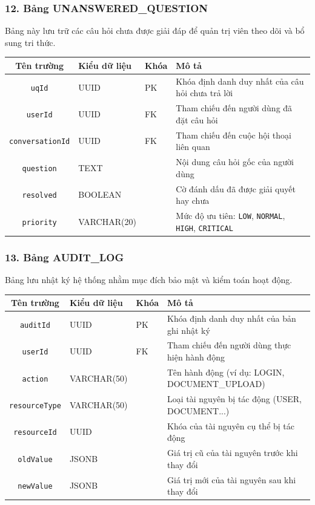 \documentclass[12pt,a4paper]{report}
\begin{document}
\subsubsection{12. Bảng UNANSWERED\_QUESTION}
Bảng này lưu trữ các câu hỏi chưa được giải đáp để quản trị viên theo dõi và bổ sung tri thức.

\begin{table}[H]
\centering
\begin{tabularx}{\textwidth}{|c|l|l|X|}
\hline
\rowcolor{gray!10}
Tên trường & Kiểu dữ liệu & Khóa & Mô tả \\ \hline
\texttt{uqId} & UUID & PK & Khóa định danh duy nhất của câu hỏi chưa trả lời \\ \hline
\texttt{userId} & UUID & FK & Tham chiếu đến người dùng đã đặt câu hỏi \\ \hline
\texttt{conversationId} & UUID & FK & Tham chiếu đến cuộc hội thoại liên quan \\ \hline
\texttt{question} & TEXT &  & Nội dung câu hỏi gốc của người dùng \\ \hline
\texttt{resolved} & BOOLEAN &  & Cờ đánh dấu đã được giải quyết hay chưa \\ \hline
\texttt{priority} & VARCHAR(20) &  & Mức độ ưu tiên: \texttt{LOW}, \texttt{NORMAL}, \texttt{HIGH}, \texttt{CRITICAL} \\ \hline
\end{tabularx}
\end{table}

\subsubsection{13. Bảng AUDIT\_LOG}
Bảng lưu nhật ký hệ thống nhằm mục đích bảo mật và kiểm toán hoạt động.

\begin{table}[H]
\centering
\begin{tabularx}{\textwidth}{|c|l|l|X|}
\hline
\rowcolor{gray!10}
Tên trường & Kiểu dữ liệu & Khóa & Mô tả \\ \hline
\texttt{auditId} & UUID & PK & Khóa định danh duy nhất của bản ghi nhật ký \\ \hline
\texttt{userId} & UUID & FK & Tham chiếu đến người dùng thực hiện hành động \\ \hline
\texttt{action} & VARCHAR(50) &  & Tên hành động (ví dụ: LOGIN, DOCUMENT\_UPLOAD) \\ \hline
\texttt{resourceType} & VARCHAR(50) &  & Loại tài nguyên bị tác động (USER, DOCUMENT...) \\ \hline
\texttt{resourceId} & UUID &  & Khóa của tài nguyên cụ thể bị tác động \\ \hline
\texttt{oldValue} & JSONB &  & Giá trị cũ của tài nguyên trước khi thay đổi \\ \hline
\texttt{newValue} & JSONB &  & Giá trị mới của tài nguyên sau khi thay đổi \\ \hline
\end{tabularx}
\end{table}
\end{document}
